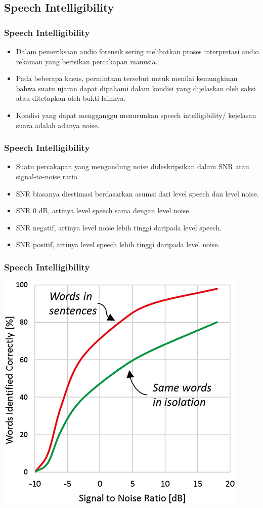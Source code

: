 \documentclass[pdflatex,compress]{beamer}
\begin{document}
\subsection{Speech Intelligibility}

\begin{frame}
	\frametitle{Speech Intelligibility}
	\begin{itemize}
		\item Dalam pemeriksaan audio forensik sering melibatkan proses interpretasi audio rekaman yang berisikan percakapan manusia.
		\item Pada beberapa kasus, permintaan tersebut untuk menilai kemungkinan bahwa suatu ujaran dapat dipahami dalam kondisi yang dijelaskan oleh saksi atau ditetapkan oleh bukti lainnya.
		\item Kondisi yang dapat mengganggu menurunkan speech intelligibility/ kejelasan suara adalah adanya noise.
	\end{itemize}
\end{frame}

\begin{frame}
	\frametitle{Speech Intelligibility}
	\begin{itemize}
		\item Suatu percakapan yang mengandung noise dideskripsikan dalam SNR atau signal-to-noise ratio.
		\item SNR biasanya diestimasi berdasarkan asumsi dari level speech dan level noise.
		\item SNR 0 dB, artinya level speech sama dengan level noise.
		\item SNR negatif, artinya level noise lebih tinggi daripada level speech.
		\item SNR positif, artinya level speech lebih tinggi daripada level noise.
	\end{itemize}
\end{frame}

\begin{frame}
	\frametitle{Speech Intelligibility}
	\begin{center}
		\includegraphics[width=0.6\linewidth]{img/img019}
	\end{center}
\end{frame}
\end{document}
